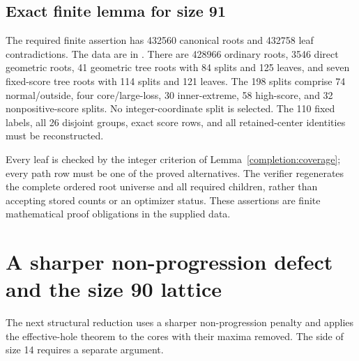 \documentclass[11pt,a4paper]{article}
\theoremstyle{remark}
\begin{document}
\subsection{Exact finite lemma for size 91}
\label{u86:finite:91}
The required finite assertion has 432560 canonical roots and 432758
leaf contradictions. The data are in .
There are 428966 ordinary roots, 3546 direct geometric roots, 41
geometric tree roots with 84 splits and 125 leaves, and seven fixed-score
tree roots with 114 splits and 121 leaves. The 198 splits comprise 74
normal/outside, four core/large-loss, 30 inner-extreme, 58 high-score,
and 32 nonpositive-score splits. No integer-coordinate split is selected.
The 110 fixed labels, all 26 disjoint groups, exact score rows, and all
retained-center identities must be reconstructed.

Every leaf is checked by the integer criterion of
Lemma~\ref{completion:coverage}; every path row must be one of the
proved alternatives. The verifier  regenerates
the complete ordered root universe and all required children, rather than
accepting stored counts or an optimizer status. These assertions are finite
mathematical proof obligations in the supplied data.



\section{A sharper non-progression defect and the size 90 lattice}\label{u86:sec:lattice90}
The next structural reduction uses a sharper non-progression penalty and
applies the effective-hole theorem to the cores with their maxima removed.
The side of size 14 requires a separate argument.
\end{document}
